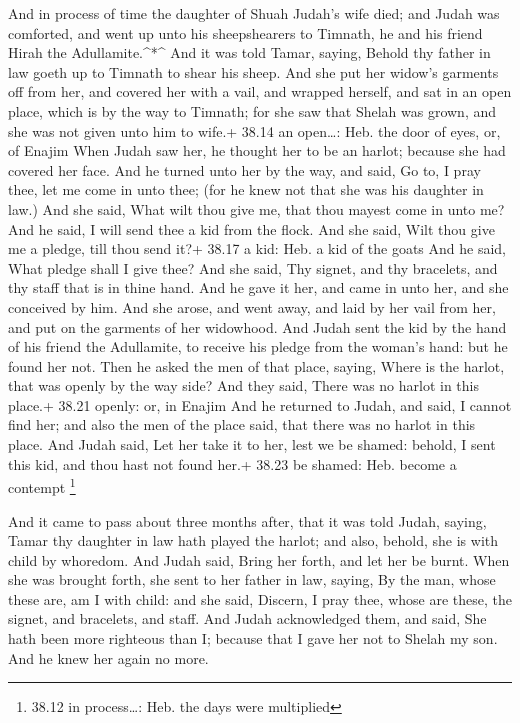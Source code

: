  And in process of time the daughter of Shuah Judah's wife
died; and Judah was comforted, and went up unto his sheepshearers to
Timnath, he and his friend Hirah the Adullamite.\^{}*\^{} 
And it was told Tamar, saying, Behold thy father in law goeth up to
Timnath to shear his sheep.  And she put her widow's
garments off from her, and covered her with a vail, and wrapped herself,
and sat in an open place, which is by the way to Timnath; for she saw
that Shelah was grown, and she was not given unto him to wife.+ 38.14 an
open\ldots: Heb. the door of eyes, or, of Enajim  When
Judah saw her, he thought her to be an harlot; because she had covered
her face.  And he turned unto her by the way, and said, Go
to, I pray thee, let me come in unto thee; (for he knew not that she was
his daughter in law.) And she said, What wilt thou give me, that thou
mayest come in unto me?  And he said, I will send thee a
kid from the flock. And she said, Wilt thou give me a pledge, till thou
send it?+ 38.17 a kid: Heb. a kid of the goats  And he
said, What pledge shall I give thee? And she said, Thy signet, and thy
bracelets, and thy staff that is in thine hand. And he gave it her, and
came in unto her, and she conceived by him.  And she arose,
and went away, and laid by her vail from her, and put on the garments of
her widowhood.  And Judah sent the kid by the hand of his
friend the Adullamite, to receive his pledge from the woman's hand: but
he found her not.  Then he asked the men of that place,
saying, Where is the harlot, that was openly by the way side? And they
said, There was no harlot in this place.+ 38.21 openly: or, in Enajim
 And he returned to Judah, and said, I cannot find her; and
also the men of the place said, that there was no harlot in this place.
 And Judah said, Let her take it to her, lest we be shamed:
behold, I sent this kid, and thou hast not found her.+ 38.23 be shamed:
Heb. become a contempt \footnote{38.12 in process\ldots: Heb. the days
  were multiplied}

 And it came to pass about three months after, that it was
told Judah, saying, Tamar thy daughter in law hath played the harlot;
and also, behold, she is with child by whoredom. And Judah said, Bring
her forth, and let her be burnt.  When she was brought
forth, she sent to her father in law, saying, By the man, whose these
are, am I with child: and she said, Discern, I pray thee, whose are
these, the signet, and bracelets, and staff.  And Judah
acknowledged them, and said, She hath been more righteous than I;
because that I gave her not to Shelah my son. And he knew her again no
more.

